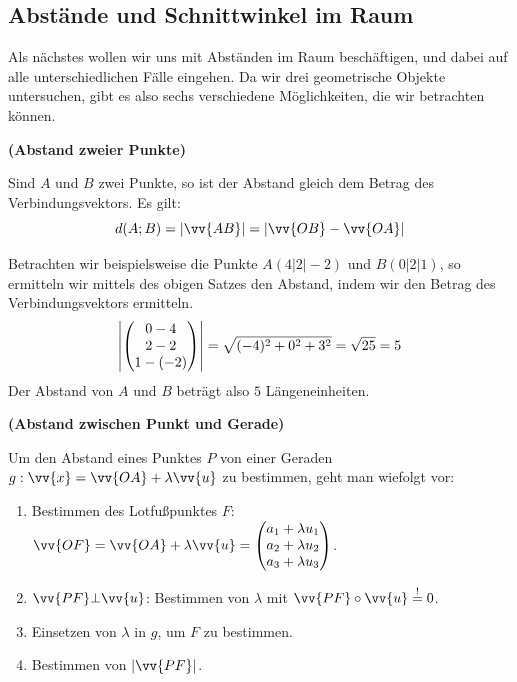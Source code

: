 \documentclass[ngerman, 12pt]{nssheetxea}
\begin{document}
\newpage
\subsection{Abstände und Schnittwinkel im Raum}
Als nächstes wollen wir uns mit Abständen im Raum beschäftigen, und dabei auf alle unterschiedlichen Fälle eingehen. Da wir drei geometrische Objekte untersuchen, gibt es also sechs verschiedene Möglichkeiten, die wir betrachten können.

\begin{theorem} \textbf{(Abstand zweier Punkte)} \par
Sind $A$ und $B$ zwei Punkte, so ist der Abstand gleich dem Betrag des Verbindungsvektors. Es gilt:
\[ d(A;B)=|\vv{AB}| = |\vv {OB} - \vv{OA}|  \]
\end{theorem}

\begin{example}
Betrachten wir beispielsweise die Punkte $A(4|2|-2)$ und $B(0|2|1)$, so ermitteln wir mittels des obigen Satzes den Abstand, indem wir den Betrag des Verbindungsvektors ermitteln.
\[ \mleft| \colvec[0-4]{2-2}{1-(-2)} \mright| = \sqrt{(-4)^2+0^2+3^2} = \sqrt{25} = 5\]
Der Abstand von $A$ und $B$ beträgt also $5$ Längeneinheiten.
\end{example}

\begin{theorem} \textbf{(Abstand zwischen Punkt und Gerade)} \par
Um den Abstand eines Punktes $P$ von einer Geraden $g:\vv{x}=\vv{OA}+\lambda \vv{u}$ zu bestimmen, geht man wiefolgt vor:
\begin{enumerate}
\item Bestimmen des Lotfußpunktes $F$: $\vv{OF}=\vv{OA}+\lambda \vv{u}=\colvec[a_1+\lambda u_1]{a_2 + \lambda u_2}{a_3 + \lambda u_3}$.
\item $\vv{PF} \bot \vv{u}$: Bestimmen von $\lambda$ mit $\vv{PF} \circ \vv{u} \stackrel{!}{=} 0$.
\item Einsetzen von $\lambda$ in $g$, um $F$ zu bestimmen.
\item Bestimmen von $|\vv{PF}|$. 
\end{enumerate}
\label{Satz:Distance_PunktGerade}
\end{theorem}
\end{document}
